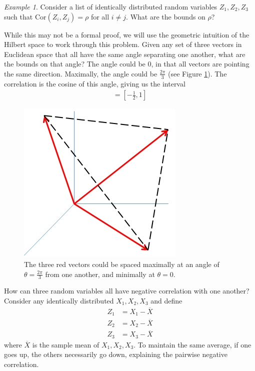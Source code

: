 \documentclass[11pt]{article}
\theoremstyle{plain}
\theoremstyle{definition}
\theoremstyle{remark}
\newtheorem{exm}{Example}[section]
\begin{document}
\begin{exm}
    Consider a list of identically distributed random variables $Z_1, Z_2, Z_3$ such that $\text{Cor}(Z_i, Z_j) = \rho$ for all $i \neq j$. What are the bounds on $\rho$?
    
    While this may not be a formal proof, we will use the geometric intuition of the Hilbert space to work through this problem. Given any set of three vectors in Euclidean space that all have the same angle separating one another, what are the bounds on that angle? The angle could be 0, in that all vectors are pointing the same direction. Maximally, the angle could be $\frac{2\pi}{3}$ (see Figure \ref{fig:three_vecs}). The correlation is the cosine of this angle, giving us the interval
    \begin{align*}
        [\cos(\tfrac{2\pi}{3}), \cos(0)] = [-\tfrac{1}{2}, 1]
    \end{align*}
    
    \begin{figure}
        \centering
        \includegraphics[width=0.5\linewidth]{figures/three_vecs.png}
        \caption{The three red vectors could be spaced maximally at an angle of $\theta = \frac{2\pi}{3}$ from one another, and minimally at $\theta = 0$.}
        \label{fig:three_vecs}
    \end{figure}
    How can three random variables all have negative correlation with one another? Consider any identically distributed $X_1, X_2, X_3$ and define
    \begin{align*}
        Z_1 &= X_1 - \overline{X}\\
        Z_2 &= X_2 - \overline{X}\\
        Z_3 &= X_3 - \overline{X}
    \end{align*}
    where $\overline{X}$ is the sample mean of $X_1, X_2, X_3$. To maintain the same average, if one goes up, the others necessarily go down, explaining the pairwise negative correlation.
\end{exm}
\end{document}
